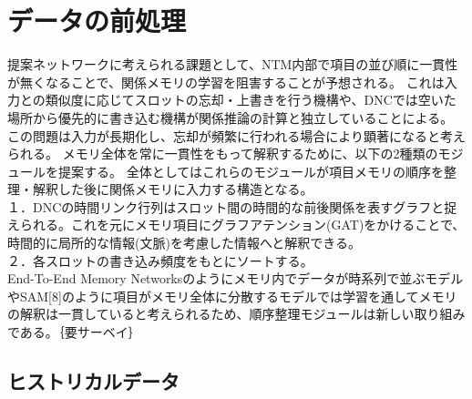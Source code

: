 \chapter{データの前処理} \label{chap:link-matlix}
提案ネットワークに考えられる課題として、NTM内部で項目の並び順に一貫性が無くなることで、関係メモリの学習を阻害することが予想される。
これは入力との類似度に応じてスロットの忘却・上書きを行う機構や、DNCでは空いた場所から優先的に書き込む機構が関係推論の計算と独立していることによる。
この問題は入力が長期化し、忘却が頻繁に行われる場合により顕著になると考えられる。
メモリ全体を常に一貫性をもって解釈するために、以下の2種類のモジュールを提案する。
全体としてはこれらのモジュールが項目メモリの順序を整理・解釈した後に関係メモリに入力する構造となる。
\\１．DNCの時間リンク行列はスロット間の時間的な前後関係を表すグラフと捉えられる。これを元にメモリ項目にグラフアテンション(GAT)\cite{gat}をかけることで、時間的に局所的な情報(文脈)を考慮した情報へと解釈できる。
\\２．各スロットの書き込み頻度をもとにソートする。
\\End-To-End Memory Networks\cite{E2E}のようにメモリ内でデータが時系列で並ぶモデルやSAM[8]のように項目がメモリ全体に分散するモデルでは学習を通してメモリの解釈は一貫していると考えられるため、順序整理モジュールは新しい取り組みである。｛要サーベイ｝


\section{ヒストリカルデータ}

